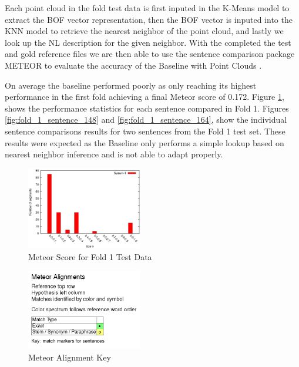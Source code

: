 \documentclass[letterpaper, 12 pt, conference]{ieeeconf}
\begin{document}
Each point cloud in the fold test data is first inputed in the K-Means model to extract the BOF vector representation, then the BOF vector is inputed into the KNN model to retrieve the nearest neighbor of the point cloud, and lastly we look up the NL description for the given neighbor. With the completed the test and gold reference files we are then able to use the sentence comparison package METEOR to evaluate the accuracy of the Baseline with Point Clouds .

On average the baseline performed poorly as only reaching its highest performance in the first fold achieving a final Meteor score of 0.172. Figure \ref{fig:fold_1_score}, shows the performance statistics for each sentence compared in Fold 1. Figures \ref{fig:fold_1_sentence_148} and \ref{fig:fold_1_sentence_164}, show the individual sentence comparisons results for two sentences from the Fold 1 test set. These results were expected as the Baseline only performs a simple lookup based on nearest neighbor inference and is not able to adapt properly.

\begin{figure}[htb!]
  \centering
  \includegraphics[width=0.45\textwidth]{fold_1_score}
  \caption{Meteor Score for Fold 1 Test Data}
  \label{fig:fold_1_score}
\end{figure}

\begin{figure}[htb!]
  \centering
  \includegraphics[width=0.45\textwidth]{meteor_alignment_key}
  \caption{Meteor Alignment Key}
  \label{fig:meteor_alignment_key}
\end{figure}
\end{document}
